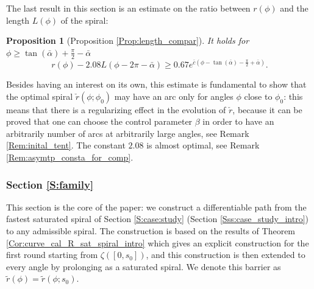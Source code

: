 \documentclass[reqno]{amsart}
\theoremstyle{definition} \newtheorem{definition}{Definition}[section]
\theoremstyle{definition} \newtheorem{remark}[definition]{Remark}
\theoremstyle{plain} \newtheorem{lemma}[definition]{Lemma}
\theoremstyle{plain} \newtheorem{proposition}[definition]{Proposition}
\theoremstyle{plain} \newtheorem{theorem}[definition]{Theorem}
\theoremstyle{plain} \newtheorem{corollary}[definition]{Corollary}
\theoremstyle{definition} \newtheorem{example}[definition]{Example}
\theoremstyle{plain} \newtheorem{claim}[clai]{Claim}
\theoremstyle{definition} \newtheorem{assumption}[definition]{Assumption}
\theoremstyle{definition} \newtheorem{observation}[definition]{Observation}
\newcommand{\1}{\mathbbm 1}
\numberwithin{equation}{section} %
\theoremstyle{plain} \newtheorem*{theorem*}{Theorem}
\theoremstyle{plain} \newtheorem{mthm}[maintheorem]{Main Theorem}
\theoremstyle{plain} \newtheorem*{mthm*}{Main Theorem}
\theoremstyle{plain} \newtheorem*{conjecture*}{Conjecture}
\theoremstyle{plain} \newtheorem{conjecture}[definition]{Conjecture}
\theoremstyle{plain} \newtheorem*{problem*}{Problem}
\begin{document}
The last result in this section is an estimate on the ratio between $r(\phi)$ and the length $L(\phi)$ of the spiral:

\begin{proposition}[Proposition \ref{Prop:length_compar}]
\label{Prop:length_compar_intro}
It holds for $\phi \geq \tan(\bar \alpha) + \frac{\pi}{2} - \bar \alpha$
\begin{equation*}
r(\phi) - 2.08 L(\phi - 2\pi - \bar \alpha) \geq 0.67 e^{\bar c(\phi - \tan(\bar \alpha) - \frac{\pi}{2} + \bar \alpha)}.
\end{equation*}
\end{proposition}

Besides having an interest on its own, this estimate is fundamental to show that the optimal spiral $\check r(\phi;\phi_0)$ may have an arc only for angles $\phi$ close to $\phi_0$: this means that there is a regularizing effect in the evolution of $\check r$, because it can be proved that one can choose the control parameter $\beta$ in order to have an arbitrarily number of arcs at arbitrarily large angles, see Remark \ref{Rem:inital_tent}. The constant $2.08$ is almost optimal, see Remark \ref{Rem:asymtp_consta_for_comp}.


\subsubsection{Section \ref{S:family}}
\label{Sss:family_intro}


This section is the core of the paper: we construct a differentiable path from the fastest saturated spiral of Section \ref{S:case:study} (Section \ref{Sss:case_study_intro}) to any admissible spiral. The construction is based on the results of Theorem \ref{Cor:curve_cal_R_sat_spiral_intro} which gives an explicit construction for the first round starting from $\zeta([0,s_0])$, and this construction is then extended to every angle by prolonging as a saturated spiral. We denote this barrier as $\tilde r(\phi) = \tilde r(\phi;s_0)$.
\end{document}
